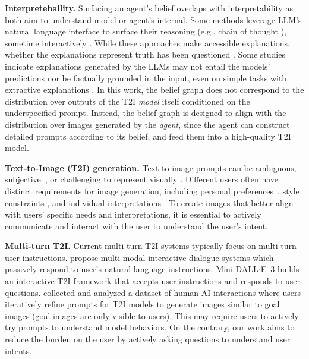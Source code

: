 \textbf{Interpretebaility.} Surfacing an agent's belief overlaps with interpretability as both aim to understand model or agent's internal. Some methods leverage LLM's natural language interface to surface their reasoning (e.g., chain of thought \citep{wei2023chainofthoughtpromptingelicitsreasoning}), sometime interactively \citep{wang2024llmcheckupconversationalexaminationlarge}. While these approaches make accessible explanations, whether the explanations represent truth has been questioned \citep{lanham2023measuringfaithfulnesschainofthoughtreasoning, wei2023largerlanguagemodelsincontext, chen2023modelsexplainthemselvescounterfactual}. Some studies indicate explanations generated by the LLMs may not entail the models’ predictions nor be factually grounded in the input, even on simple tasks with extractive explanations \citep{ye2022unreliabilityexplanationsfewshotprompting}. In this work, the belief graph does not correspond to the distribution over outputs of the T2I \emph{model} itself conditioned on the underspecified prompt. Instead, the belief graph is designed to align with the distribution over images generated by the \emph{agent}, since the agent can construct detailed prompts according to its belief, and feed them into a high-quality T2I model.

\textbf{Text-to-Image (T2I) generation.} Text-to-image prompts can be ambiguous, subjective~\citep{hutchinson2022underspecificationscenedescriptiontodepictiontasks}, or challenging to represent visually \citep{wiles2024revisiting}. Different users often have distinct requirements for image generation, including personal preferences~\citep{wei2024powerful}, style constraints \citep{wang2023generative}, and individual interpretations \citep{yin2019semantics}. To create images that better align with users' specific needs and interpretations, it is essential to actively communicate and interact with the user to understand the user's intent.

\textbf{Multi-turn T2I.} Current multi-turn T2I systems typically focus on multi-turn user instructions. \cite{huang2024dialoggen, sun2023dsg} propose multi-modal interactive dialogue systems which passively respond to user's natural language instructions. %
Mini DALL$\cdot$E~3 \citep{lai2023minidalle3interactivetextimage} builds an interactive T2I framework that accepts user instructions and responds to user questions. %
\cite{vodrahalli2023artwhisperer} collected and analyzed a dataset of human-AI interactions where users iteratively refine prompts for T2I models to generate images similar to goal images (goal images are only visible to users). This may require users to actively try prompts to understand model behaviors. On the contrary, our work aims to reduce the burden on the user by actively asking questions to understand user intents. 

